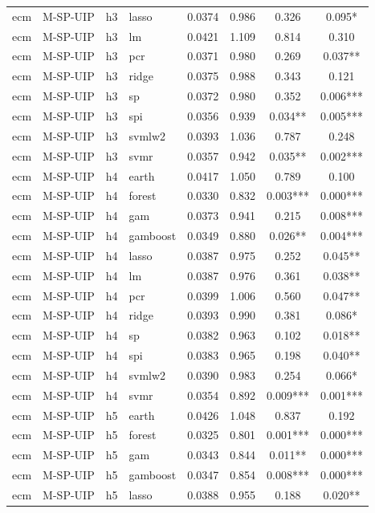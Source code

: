 \begin{ThreePartTable}
\begin{longtable}[t]{llclcccc}
ecm & M-SP-UIP & h3 & lasso & 0.0374 & 0.986 & 0.326 & 0.095*\\
ecm & M-SP-UIP & h3 & lm & 0.0421 & 1.109 & 0.814 & 0.310\\
ecm & M-SP-UIP & h3 & pcr & 0.0371 & 0.980 & 0.269 & 0.037**\\
ecm & M-SP-UIP & h3 & ridge & 0.0375 & 0.988 & 0.343 & 0.121\\
ecm & M-SP-UIP & h3 & sp & 0.0372 & 0.980 & 0.352 & 0.006***\\
ecm & M-SP-UIP & h3 & spi & 0.0356 & 0.939 & 0.034** & 0.005***\\
ecm & M-SP-UIP & h3 & svmlw2 & 0.0393 & 1.036 & 0.787 & 0.248\\
ecm & M-SP-UIP & h3 & svmr & 0.0357 & 0.942 & 0.035** & 0.002***\\
\addlinespace
ecm & M-SP-UIP & h4 & earth & 0.0417 & 1.050 & 0.789 & 0.100\\
ecm & M-SP-UIP & h4 & forest & 0.0330 & 0.832 & 0.003*** & 0.000***\\
ecm & M-SP-UIP & h4 & gam & 0.0373 & 0.941 & 0.215 & 0.008***\\
ecm & M-SP-UIP & h4 & gamboost & 0.0349 & 0.880 & 0.026** & 0.004***\\
ecm & M-SP-UIP & h4 & lasso & 0.0387 & 0.975 & 0.252 & 0.045**\\
ecm & M-SP-UIP & h4 & lm & 0.0387 & 0.976 & 0.361 & 0.038**\\
ecm & M-SP-UIP & h4 & pcr & 0.0399 & 1.006 & 0.560 & 0.047**\\
ecm & M-SP-UIP & h4 & ridge & 0.0393 & 0.990 & 0.381 & 0.086*\\
ecm & M-SP-UIP & h4 & sp & 0.0382 & 0.963 & 0.102 & 0.018**\\
ecm & M-SP-UIP & h4 & spi & 0.0383 & 0.965 & 0.198 & 0.040**\\
ecm & M-SP-UIP & h4 & svmlw2 & 0.0390 & 0.983 & 0.254 & 0.066*\\
ecm & M-SP-UIP & h4 & svmr & 0.0354 & 0.892 & 0.009*** & 0.001***\\
\addlinespace
ecm & M-SP-UIP & h5 & earth & 0.0426 & 1.048 & 0.837 & 0.192\\
ecm & M-SP-UIP & h5 & forest & 0.0325 & 0.801 & 0.001*** & 0.000***\\
ecm & M-SP-UIP & h5 & gam & 0.0343 & 0.844 & 0.011** & 0.000***\\
ecm & M-SP-UIP & h5 & gamboost & 0.0347 & 0.854 & 0.008*** & 0.000***\\
ecm & M-SP-UIP & h5 & lasso & 0.0388 & 0.955 & 0.188 & 0.020**\\

\end{longtable}
\end{ThreePartTable}

